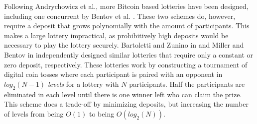 Following Andrychowicz et al., more Bitcoin based lotteries have been designed, including one concurrent by Bentov et al. \cite{bentov_how_2014}. These two schemes do, however, require a deposit that grows polynomially with the amount of participants. This makes a large lottery impractical, as prohibitively high deposits would be necessary to play the lottery securely. Bartoletti and Zunino in \cite{bartoletti_constant-deposit_2017} and Miller and Bentov in \cite{miller_zero-collateral_2017} independently designed similar lotteries that require only a constant or zero deposit, respectively. These lotteries work by constructing a tournament of digital coin tosses where each participant is paired with an opponent in $log_2(N-1)$ \emph{levels} for a lottery with $N$ participants. Half the participants are eliminated in each level until there is one winner left who can claim the prize. This scheme does a trade-off by minimizing deposits, but increasing the number of levels from being $O(1)$ to being $O(log_2(N))$. 
